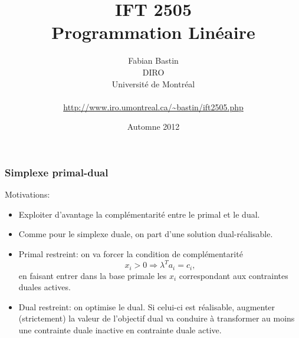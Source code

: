 \documentclass[t,usepdftitle=false]{beamer}
\title[IFT2505]{IFT 2505\\Programmation Linéaire}
\author[Fabian Bastin]{Fabian Bastin\\DIRO\\Université de Montréal\\\mbox{}\\\url{http://www.iro.umontreal.ca/~bastin/ift2505.php}}
\date{Automne 2012}
\begin{document}
\frame{\titlepage}

\begin{frame}
\frametitle{Simplexe primal-dual}

Motivations:
\begin{itemize}
\item
Exploiter d'avantage la complémentarité entre le primal et le dual.
\item
Comme pour le simplexe duale, on part d'une solution dual-réalisable.
\item
Primal restreint: on va forcer la condition de complémentarité
\[
x_i > 0 \Rightarrow \lambda^T a_i = c_i,
\]
en faisant entrer dans la base primale les $x_i$ correspondant aux contraintes duales actives.
\item
Dual restreint: on optimise le dual. Si celui-ci est réalisable, augmenter (strictement) la valeur de l'objectif dual va conduire à transformer au moins une contrainte duale inactive en contrainte duale active.
\end{itemize}

\end{frame}
\end{document}
